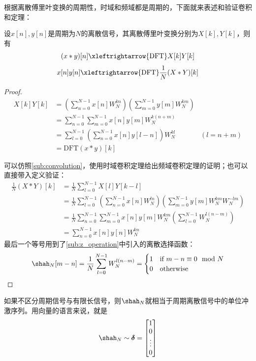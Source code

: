 根据离散傅里叶变换的周期性，时域和频域都是周期的，下面就来表述和验证卷积和定理：
\begin{theorem}[离散傅里叶变换的卷积和定理]
    设$x[n],y[n]$是周期为$N$的离散信号，其离散傅里叶变换分别为$X[k],Y[k]$，则有
    \[(x*y)[n]\xleftrightarrow{\mathrm{DFT}}X[k]Y[k]\]
    \[x[n]y[n]\xleftrightarrow{\mathrm{DFT}}\frac{1}{N}(X * Y)[k]\]
\end{theorem}
\begin{proof}
    \begin{align*}
        X[k]Y[k]&=\left(\sum_{n=0}^{N-1}x[n]W_N^{kn}\right)\left(\sum_{m=0}^{N-1}y[m]W_N^{km}\right)\\
        &=\sum_{n=0}^{N-1}\sum_{m=0}^{N-1}x[n]y[m]W_N^{k(n+m)}\\
        &=\sum_{l=0}^{N-1}\left(\sum_{n=0}^{N-1}x[n]y[l-n]\right)W_N^{kl}&(l=n+m)\\
        &=\mathrm{DFT}(x*y)[k]
    \end{align*}

    可以仿照\ref{sub:convolution}，使用时域卷积定理给出频域卷积定理的证明；也可以直接带入定义验证：
    \begin{align*}
        \frac{1}{N}(X * Y)[k]&=\frac{1}{N}\sum_{l=0}^{N-1}X[l]Y[k-l]\\
        &=\frac{1}{N}\sum_{l=0}^{N-1}\left(\sum_{n=0}^{N-1}x[n]W_N^{ln}\right)\left(\sum_{m=0}^{N-1}y[m]W_N^{k m}W_N^{-lm}\right)\\
        &=\frac{1}{N}\sum_{n=0}^{N-1}\sum_{m=0}^{N-1}x[n]y[m]W_N^{k m}\left(\sum_{l=0}^{N-1}W_N^{l(n-m)}\right)\\
        &=\sum_{n=0}^{N-1}x[n]y[n]W_N^{k n}
    \end{align*}
    最后一个等号用到了\ref{sub:z_operation}中引入的离散选择函数：
    \[\shah_N[m-n]=\frac{1}{N}\sum_{l=0}^{N-1}W_N^{l(n-m)}=\begin{cases}
    1 & \text{if } m-n\equiv 0 \mod N \\
    0 & \mathrm{otherwise}
    \end{cases}\]
\end{proof}

如果不区分周期信号与有限长信号，则$\shah_N$就相当于周期离散信号中的单位冲激序列。用向量的语言来说，就是
\[\shah_N\sim\boldsymbol{\delta}=\begin{bmatrix}
1  \\
0  \\
\vdots \\
0
\end{bmatrix}\]

